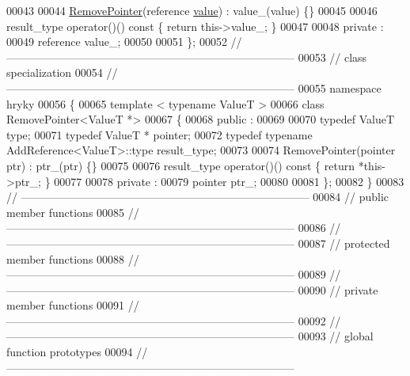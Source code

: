 \begin{DoxyCode}
00043 
00044     \hyperlink{classhryky_1_1_remove_pointer}{RemovePointer}(reference \hyperlink{namespacehryky_1_1log_1_1format_a5b9af9c1a7b018d54144acfb1b8cc960}{value}) : value\_(value) \{\}
00045 
00046     result\_type operator()()\textcolor{keyword}{ const }\{ \textcolor{keywordflow}{return} this->value\_; \}
00047 
00048 \textcolor{keyword}{private} :
00049     reference   value\_;
00050 
00051 \};
00052 \textcolor{comment}{//
      ------------------------------------------------------------------------------}
00053 \textcolor{comment}{// class specialization}
00054 \textcolor{comment}{//
      ------------------------------------------------------------------------------}
00055 \textcolor{keyword}{namespace }hryky
00056 \{
00065 \textcolor{keyword}{template} < \textcolor{keyword}{typename} ValueT >
00066 \textcolor{keyword}{class }RemovePointer<ValueT *>
00067 \{
00068 \textcolor{keyword}{public} :
00069 
00070     \textcolor{keyword}{typedef} ValueT                                  type;
00071     \textcolor{keyword}{typedef} ValueT *                                pointer;
00072     \textcolor{keyword}{typedef} \textcolor{keyword}{typename} AddReference<ValueT>::type     result\_type;
00073 
00074     RemovePointer(pointer ptr) : ptr\_(ptr) \{\}
00075 
00076     result\_type operator()()\textcolor{keyword}{ const }\{ \textcolor{keywordflow}{return} *this->ptr\_; \}
00077 
00078 \textcolor{keyword}{private} :
00079     pointer     ptr\_;
00080 
00081 \};
00082 \}
00083 \textcolor{comment}{//
      ------------------------------------------------------------------------------}
00084 \textcolor{comment}{// public member functions}
00085 \textcolor{comment}{//
      ------------------------------------------------------------------------------}
00086 \textcolor{comment}{//
      ------------------------------------------------------------------------------}
00087 \textcolor{comment}{// protected member functions}
00088 \textcolor{comment}{//
      ------------------------------------------------------------------------------}
00089 \textcolor{comment}{//
      ------------------------------------------------------------------------------}
00090 \textcolor{comment}{// private member functions}
00091 \textcolor{comment}{//
      ------------------------------------------------------------------------------}
00092 \textcolor{comment}{//
      ------------------------------------------------------------------------------}
00093 \textcolor{comment}{// global function prototypes}
00094 \textcolor{comment}{//
      ------------------------------------------------------------------------------}

\end{DoxyCode}
